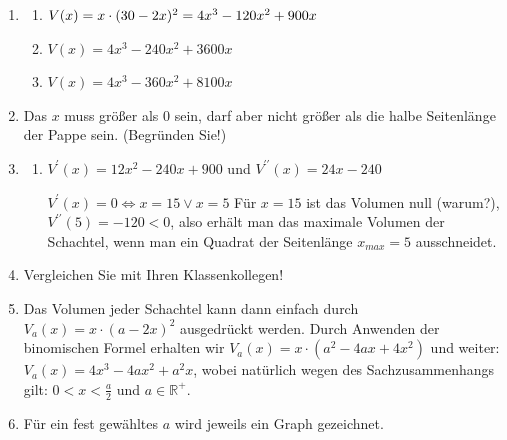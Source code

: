 \documentclass[11pt,a4paper,twoside,fleqn]{article}
\begin{document}
\begin{solution}  
  \begin{enumerate}
  \item 
    \begin{multicols}{2}
      \begin{enumerate}
      \item $V(x)=x\cdot (30-2x)^2=\\4x^3-120x^2+900x$
      \item $V(x)=4x^3 - 240x^2 +3600x$
      \item $V(x)=4x^3 - 360x^2 + 8100x$
      \end{enumerate}
    \end{multicols}
  \item Das $x$ muss größer als $0$ sein, darf aber nicht größer als
   die halbe Seitenlänge der Pappe sein. (Begründen Sie!)
  \item 
    \begin{enumerate}
   
        \item $V^\prime(x)=12x^2-240x +900$ und
        $V^{\prime\prime}(x)=24x -240$

        $V^\prime(x)=0 \Leftrightarrow x=15 \vee x=5$ Für $x=15$ ist
        das Volumen null (warum?), $V^{\prime\prime}(5)=-120 < 0$, also
        erhält man das maximale Volumen der Schachtel, wenn man ein
        Quadrat der Seitenlänge $x_{max}=5$ ausschneidet.
        \end{enumerate}
  
      \item Vergleichen Sie mit Ihren Klassenkollegen!
      \item Das Volumen jeder Schachtel kann dann einfach durch
        $V_a(x)=x\cdot (a - 2x)^2$ ausgedrückt werden.  Durch Anwenden
        der binomischen Formel erhalten wir $ V_a(x)=x\cdot(a^2 - 4ax
        + 4x^2)$ und weiter: $ V_a(x)=4x^3 - 4ax^2+ a^2x$, wobei
        natürlich wegen des Sachzusammenhangs gilt: $0 < x < \frac a
        2$ und $a\in\mathbb{R}^+$.
      \item 
        Für ein fest gewähltes $a$ wird jeweils ein Graph gezeichnet.


\end{enumerate}
\end{solution}
\end{document}
